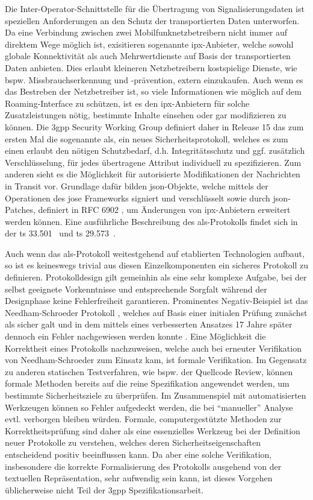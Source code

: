 Die Inter-Operator-Schnittstelle für die Übertragung von Signalisierungsdaten ist speziellen Anforderungen an den Schutz der transportierten Daten unterworfen.
Da eine Verbindung zwischen zwei Mobilfunknetzbetreibern nicht immer auf direktem Wege möglich ist, exisitieren sogenannte \gls{ipx}-Anbieter, welche sowohl globale Konnektivität als auch Mehrwertdienste auf Basis der transportierten Daten anbieten.
Dies erlaubt kleineren Netzbetreibern kostspielige Dienste, wie bspw. Missbrauchserkennung und -prävention, extern einzukaufen.
Auch wenn es das Bestreben der Netzbetreiber ist, so viele Informationen wie möglich auf dem Roaming-Interface zu schützen, ist es den  \gls{ipx}-Anbietern für solche Zusatzleistungen nötig, bestimmte Inhalte einsehen oder gar modifizieren zu können.
Die \gls{3gpp} Security Working Group definiert daher in Release 15 das zum ersten Mal die sogenannte \gls{als}, ein neues Sicherheitsprotokoll, welches es zum einen erlaubt den nötigen Schutzbedarf, d.h. Integritätsschutz und  ggf. zusätzlich Verschlüsselung, für jedes übertragene Attribut individuell zu spezifizieren. Zum anderen sieht es die Möglichkeit für autorisierte Modifikationen der Nachrichten in Transit vor.
Grundlage dafür bilden \gls{json}-Objekte, welche mittels der Operationen des \gls{jose} Frameworks \cite{JWS, JWE} signiert und verschlüsselt sowie durch \gls{json}-Patches, definiert in RFC 6902 \cite{JsonPatch}, um Änderungen von \gls{ipx}-Anbietern erweitert werden können.
Eine ausführliche Beschreibung des \gls{als}-Protokolls findet sich in der \gls{ts} 33.501~\cite{TS33501} und \gls{ts} 29.573~\cite{TS29573}.

Auch wenn das \gls{als}-Protokoll weitestgehend auf etablierten Technologien aufbaut, so ist es keineswegs trivial aus diesen Einzelkomponenten ein sicheres Protokoll zu definieren.
Protokolldesign gilt gemeinhin als eine sehr komplexe Aufgabe, bei der selbst geeignete Vorkenntnisse und entsprechende Sorgfalt während der Designphase keine Fehlerfreiheit garantieren.
Prominentes Negativ-Beispiel ist das Needham-Schroeder Protokoll \cite{needham1978using}, welches auf Basis einer initialen Prüfung zunächst als sicher galt und in dem mittels eines verbesserten Ansatzes 17 Jahre später dennoch ein Fehler nachgewiesen werden konnte \cite{lowe1996breaking}.
Eine Möglichkeit die Korrektheit eines Protokolls nachzuweisen, welche auch bei erneuter Verifikation von Needham-Schroeder zum Einsatz kam, ist formale Verifikation.
Im Gegensatz zu anderen statischen Testverfahren, wie bspw. der Quellcode Review, können formale Methoden bereits auf die reine Spezifikation angewendet werden, um bestimmte Sicherheitsziele zu überprüfen.
Im Zusammenspiel mit automatisierten Werkzeugen können so Fehler aufgedeckt werden, die bei ``manueller'' Analyse evtl. verborgen bleiben würden.
Formale, computergestützte Methoden zur Korrektheitsprüfung sind daher als eine essenzielles Werkzeug bei der Definition neuer Protokolle zu verstehen, welches deren Sicherheitseigenschaften entscheidend positiv beeinflussen kann.
Da aber eine solche Verifikation, insbesondere die korrekte Formalisierung des Protokolls ausgehend von der textuellen Repräsentation, sehr aufwendig sein kann, ist dieses Vorgehen üblicherweise nicht Teil der \gls{3gpp} Spezifikationsarbeit.

